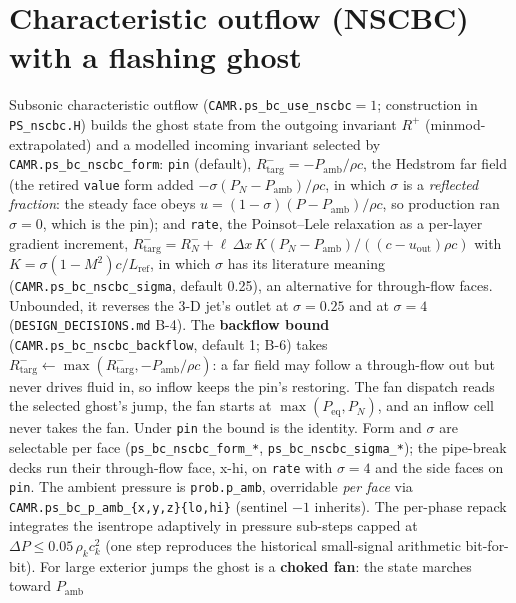 \documentclass[11pt,a4paper]{article}
\newcommand{\code}[1]{\texttt{\small #1}}
\begin{document}
\section{Characteristic outflow (NSCBC) with a flashing ghost}
\label{sec:nscbc}

Subsonic characteristic outflow (\code{CAMR.ps\_bc\_use\_nscbc}$=1$;
construction in \code{PS\_nscbc.H}) builds the ghost state from the
outgoing invariant $R^+$ (minmod-extrapolated) and a modelled incoming
invariant selected by \code{CAMR.ps\_bc\_nscbc\_form}: \code{pin}
(default), $R^-_{\mathrm{targ}}=-P_{\mathrm{amb}}/\rho c$, the Hedstrom
far field (the retired \code{value} form added $-\sigma(P_N-P_{\mathrm{amb}})/\rho c$,
in which $\sigma$ is a \emph{reflected fraction}: the steady face obeys
$u=(1-\sigma)(P-P_{\mathrm{amb}})/\rho c$, so production ran $\sigma=0$,
which is the pin); and \code{rate}, the
Poinsot--Lele relaxation as a per-layer gradient increment,
$R^-_{\mathrm{targ}}=R^-_N+\ell\,\Delta x\,K(P_N-P_{\mathrm{amb}})
/((c-u_{\mathrm{out}})\rho c)$ with $K=\sigma(1-M^2)c/L_{\mathrm{ref}}$,
in which $\sigma$ has its literature meaning
(\code{CAMR.ps\_bc\_nscbc\_sigma}, default 0.25), an alternative for
through-flow faces.  Unbounded, it reverses the 3-D jet's outlet at
$\sigma=0.25$ and at $\sigma=4$ (\code{DESIGN\_DECISIONS.md} B-4).  The
\textbf{backflow bound} (\code{CAMR.ps\_bc\_nscbc\_backflow}, default 1;
B-6) takes $R^-_{\mathrm{targ}}\leftarrow\max(R^-_{\mathrm{targ}},
-P_{\mathrm{amb}}/\rho c)$: a far field may follow a through-flow out but
never drives fluid in, so inflow keeps the pin's restoring.  The fan
dispatch reads the selected ghost's jump, the fan starts at
$\max(P_{\mathrm{eq}},P_N)$, and an inflow cell never takes the fan.
Under \code{pin} the bound is the identity.  Form and $\sigma$ are
selectable per face (\code{ps\_bc\_nscbc\_form\_*},
\code{ps\_bc\_nscbc\_sigma\_*}); the pipe-break decks run their
through-flow face, x-hi, on \code{rate} with $\sigma=4$ and the side
faces on \code{pin}.  The ambient pressure is \code{prob.p\_amb}, overridable
\emph{per face} via \code{CAMR.ps\_bc\_p\_amb\_\{x,y,z\}\{lo,hi\}}
(sentinel $-1$ inherits).  The per-phase repack integrates the isentrope
adaptively in pressure sub-steps capped at
$\Delta P \le 0.05\,\rho_k c_k^2$ (one step reproduces the historical
small-signal arithmetic bit-for-bit).  For large exterior jumps the ghost
is a \textbf{choked fan}: the state marches toward $P_{\mathrm{amb}}$
\end{document}
